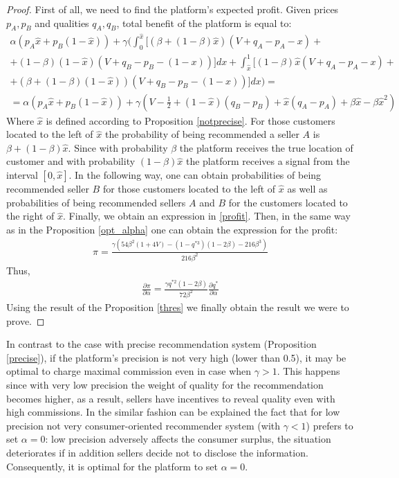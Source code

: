 \documentclass[a4paper]{article}
\begin{document}
\begin{proof}
 First of all, we need to find the platform's expected profit. Given prices $p_A, p_B$ and qualities $q_A, q_B$, total benefit of the platform is equal to:
 \begin{align}\label{profit}
 \alpha(p_A \hat{x} + p_B(1-\hat{x})) + \gamma \biggl(\int_{0}^{\hat{x}} \biggl[ (\beta +(1-\beta)\hat{x})(V + q_A - p_A - x) + \nonumber \\+ (1-\beta)(1-\hat{x})(V + q_B - p_B - (1-x))\biggr]dx + \int_{\hat{x}}^1 \biggl[(1-\beta) \hat{x}(V+q_A-p_A-x) + \nonumber\\
 +(\beta + (1-\beta)(1-\hat{x}))(V + q_B - p_B -(1-x)) \biggr] dx\biggr) = \\
 = 	\alpha(p_A \hat{x} + p_B(1-\hat{x})) + \gamma \left(V - \frac{1}{2}+(1-\hat{x})(q_B - p_B) + \hat{x}(q_A-p_A) + \beta \hat{x} - \beta \hat{x}^2  \right)\nonumber
 \end{align}
 Where $\hat{x}$ is defined according to Proposition \ref{notprecise}. For those customers located to the left of $\hat{x}$ the probability of being recommended a seller $A$ is $\beta + (1-\beta) \hat{x}$. Since with probability $\beta$ the platform receives the true location of customer and with probability $(1-\beta) \hat{x}$ the platform receives a signal from the interval $[0, \hat{x}]$. In the following way, one can obtain probabilities of being recommended seller $B$ for those customers located to the left of $\hat{x}$ as well as probabilities of being recommended sellers $A$ and $B$ for the customers located to the right of $\hat{x}$. Finally, we obtain an expression in \eqref{profit}. Then, in the same way as in the Proposition \ref{opt_alpha} one can obtain the expression for the profit:
 \begin{align*}
 \pi = \frac{\gamma(54 \beta^2(1+4V) - (1-q^{*3})(1-2\beta) - 216 \beta^3)}{216 \beta^2}
 \end{align*}
 Thus, \begin{align*}
 \frac{\partial \pi }{\partial \alpha} = \frac{\gamma q^{*2}(1-2\beta)}{72 \beta^2} \frac{\partial q^*}{\partial \alpha}
 \end{align*}
 Using the result of the Proposition \ref{thres} we finally obtain the result we were to prove.
\end{proof}
In contrast to the case with precise recommendation system (Proposition \ref{precise}), if the platform's precision is not very high (lower than 0.5), it may be optimal to charge maximal commission even in case when $\gamma > 1$. This happens since with very low precision the weight of quality for the recommendation becomes higher, as a result, sellers have incentives to reveal quality even with high commissions. In the similar fashion can be explained the fact that for low precision not very consumer-oriented recommender system (with $\gamma < 1$) prefers to set $\alpha = 0$: low precision adversely affects the consumer surplus, the situation deteriorates if in addition sellers decide not to disclose the information. Consequently, it is optimal for the platform to set $\alpha = 0$.
\end{document}
